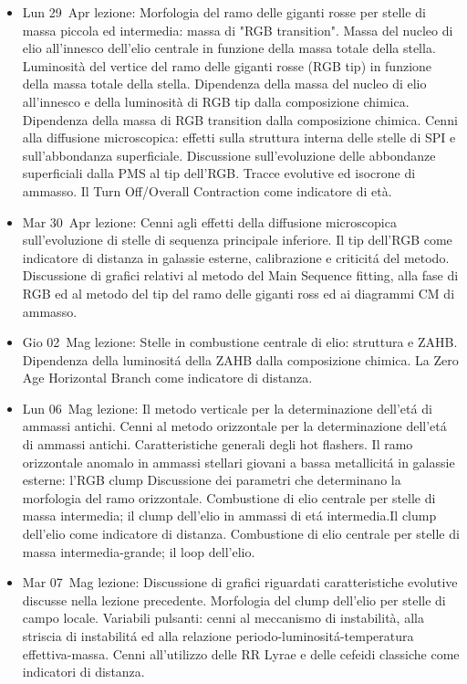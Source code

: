 \begin{itemize}
\item Lun 29 Apr lezione: Morfologia del ramo delle giganti rosse per stelle di massa piccola ed intermedia: massa di "RGB transition". Massa del nucleo di elio all'innesco dell'elio centrale in funzione della massa totale della stella. Luminosità del vertice del ramo delle giganti rosse (RGB tip) in funzione della massa totale della stella. Dipendenza della massa del nucleo di elio all'innesco e della luminosità di RGB tip dalla composizione chimica. Dipendenza della massa di RGB transition dalla composizione chimica. Cenni alla diffusione microscopica: effetti sulla struttura interna delle stelle di SPI e sull'abbondanza superficiale. Discussione sull'evoluzione delle abbondanze superficiali dalla PMS al tip dell'RGB. Tracce evolutive ed isocrone di ammasso. Il Turn Off/Overall Contraction come indicatore di età. 
\item Mar 30 Apr lezione: Cenni agli effetti della diffusione microscopica sull'evoluzione di stelle di sequenza principale inferiore. Il tip dell'RGB come indicatore di distanza in galassie esterne, calibrazione e criticit\'a del metodo. Discussione di grafici relativi al metodo del Main Sequence fitting, alla fase di RGB ed al metodo del tip del ramo delle giganti ross ed ai diagrammi CM di ammasso. 
\item Gio 02 Mag lezione: Stelle in combustione centrale di elio: struttura e ZAHB. Dipendenza della luminosit\'a della ZAHB dalla composizione chimica. La Zero Age Horizontal Branch come indicatore di distanza. 
\item Lun 06 Mag lezione: Il metodo verticale per la determinazione dell'et\'a di ammassi antichi. Cenni al metodo orizzontale per la determinazione dell'et\'a di ammassi antichi. Caratteristiche generali degli hot flashers. Il ramo orizzontale anomalo in ammassi stellari giovani a bassa metallicit\'a in galassie esterne: l'RGB clump Discussione dei parametri che determinano la morfologia del ramo orizzontale. Combustione di elio centrale per stelle di massa intermedia; il clump dell'elio in ammassi di et\'a intermedia.Il clump dell'elio come indicatore di distanza. Combustione di elio centrale per stelle di massa intermedia-grande; il loop dell'elio. 
\item Mar 07 Mag lezione: Discussione di grafici riguardati caratteristiche evolutive discusse nella lezione precedente. Morfologia del clump dell'elio per stelle di campo locale. Variabili pulsanti: cenni al meccanismo di instabilità, alla striscia di instabilit\'a ed alla relazione periodo-luminosit\'a-temperatura effettiva-massa. Cenni all'utilizzo delle RR Lyrae e delle cefeidi classiche come indicatori di distanza. 

\end{itemize}
